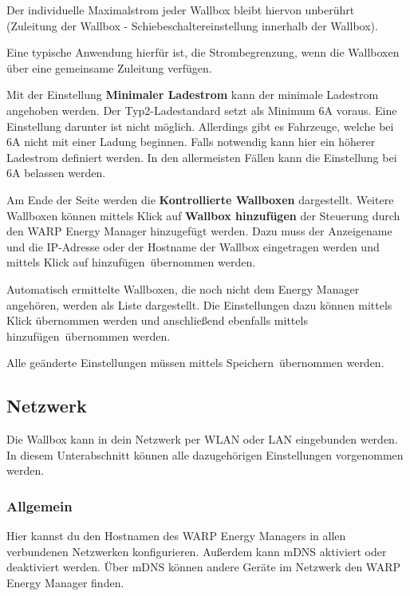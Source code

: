\documentclass[a4paper,10pt]{article}
\newcommand{\gfx}[1]{\texttt{[image: \#1]}}
\begin{document}
\begin{multicols*}{2}
	Der individuelle Maximalstrom jeder Wallbox bleibt hiervon unberührt
	(Zuleitung der Wallbox - Schiebeschaltereinstellung innerhalb der Wallbox).

	Eine typische Anwendung hierfür ist, die Strombegrenzung, 
	wenn die Wallboxen über eine gemeinsame Zuleitung verfügen.

	Mit der Einstellung \textbf{Minimaler Ladestrom} kann der minimale Ladestrom
	angehoben werden. Der Typ2-Ladestandard setzt als Minimum 6A voraus. Eine
	Einstellung darunter ist nicht möglich. Allerdings gibt es Fahrzeuge, welche 
	bei 6A nicht mit einer Ladung beginnen. Falls notwendig kann hier ein höherer 
	Ladestrom definiert werden. In den allermeisten Fällen kann die Einstellung
	bei 6A belassen werden.

	Am Ende der Seite werden die \textbf{Kontrollierte
	Wallboxen} dargestellt. Weitere Wallboxen können mittels Klick auf
	\textbf{Wallbox hinzufügen} der Steuerung durch den WARP Energy Manager
	hinzugefügt werden. Dazu muss der Anzeigename und die IP-Adresse oder der
	Hostname der Wallbox eingetragen werden und mittels Klick auf \glqq
	hinzufügen\grqq~übernommen werden.

	Automatisch ermittelte Wallboxen, die noch nicht dem Energy Manager
	angehören, werden als Liste dargestellt. Die Einstellungen dazu können
	mittels Klick übernommen werden und anschließend ebenfalls mittels \glqq
	hinzufügen\grqq~übernommen werden.

	Alle geänderte Einstellungen müssen mittels \glqq Speichern\grqq~übernommen 
	werden.


	\subsection{Netzwerk}
	\label{network}
	Die Wallbox kann in dein Netzwerk per WLAN oder LAN eingebunden werden.
	In diesem Unterabschnitt können alle dazugehörigen Einstellungen vorgenommen werden.

	\subsubsection{Allgemein}
	Hier kannst du den Hostnamen des WARP Energy Managers in allen verbundenen Netzwerken konfigurieren. Außerdem kann mDNS aktiviert oder deaktiviert werden.
	Über mDNS können andere Geräte im Netzwerk den WARP Energy Manager finden.




\end{multicols*}
\end{document}
